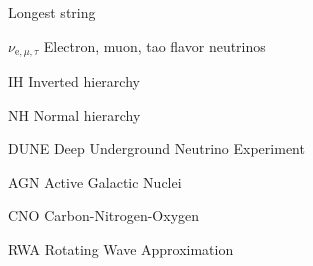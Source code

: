 
\begin{glossary}{Longest  string}
    
    \item[$\nu_{\mathrm e, \mu, \tau}$]
        Electron, muon, tao flavor neutrinos
    \item[IH]
        Inverted hierarchy
    \item[NH]
        Normal hierarchy
    \item[DUNE]
        Deep Underground Neutrino Experiment
    \item[AGN]
        Active Galactic Nuclei
    \item[CNO]
        Carbon-Nitrogen-Oxygen
    \item[RWA]
        Rotating Wave Approximation
\end{glossary}
